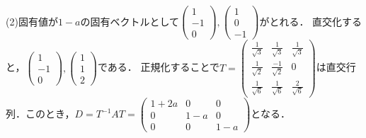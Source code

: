 \documentclass[
		book,
		head_space=20mm,
		foot_space=20mm,
		gutter=10mm,
		line_length=190mm
]{jlreq}
\begin{document}
(2)固有値が$1-a$の固有ベクトルとして$\begin{pmatrix}
1\\-1\\0
\end{pmatrix},\begin{pmatrix}
1\\0\\-1
\end{pmatrix}$がとれる．
直交化すると，$\begin{pmatrix}
1\\-1\\0
\end{pmatrix},\begin{pmatrix}
1\\1\\2
\end{pmatrix}$である．
正規化することで$T=\begin{pmatrix}
\frac{1}{\sqrt{3}}&\frac{1}{\sqrt{3}}&\frac{1}{\sqrt{3}}\\
\frac{1}{\sqrt{2}}&\frac{-1}{\sqrt{2}}&0\\
\frac{1}{\sqrt{6}}&\frac{1}{\sqrt{6}}&\frac{2}{\sqrt{6}}
\end{pmatrix}$は直交行列．このとき，$D=T^{-1}AT=\begin{pmatrix}
1+2a&0&0\\
0&1-a&0\\
0&0&1-a
\end{pmatrix}$となる．
\end{document}
